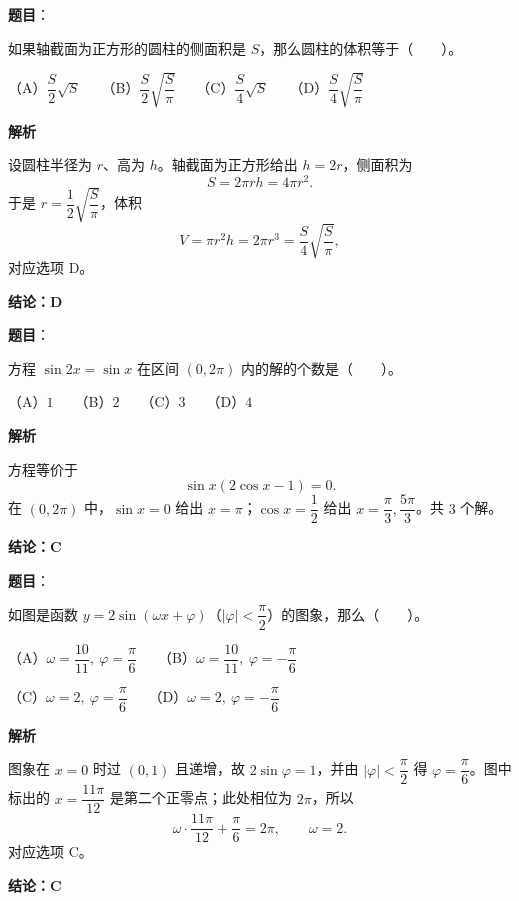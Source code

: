 \begin{answer}

\textbf{题目}：

如果轴截面为正方形的圆柱的侧面积是 $S$，那么圆柱的体积等于\mbox{（　　）}。

（A）$\dfrac S2\sqrt S$　　（B）$\dfrac S2\sqrt{\dfrac S\pi}$　　（C）$\dfrac S4\sqrt S$　　（D）$\dfrac S4\sqrt{\dfrac S\pi}$

\textbf{解析}

设圆柱半径为 $r$、高为 $h$。轴截面为正方形给出 $h=2r$，侧面积为
\nopagebreak[4]
\[
S=2\pi rh=4\pi r^2.
\]
于是 $r=\dfrac12\sqrt{\dfrac S\pi}$，体积
\nopagebreak[4]
\[
V=\pi r^2h=2\pi r^3
=\frac S4\sqrt{\frac S\pi},
\]
对应选项 D。

\textbf{结论：D}


\end{answer}
\begin{answer}

\textbf{题目}：

方程 $\sin 2x=\sin x$ 在区间 $(0,2\pi)$ 内的解的个数是\mbox{（　　）}。

（A）$1$　　（B）$2$　　（C）$3$　　（D）$4$

\textbf{解析}

方程等价于
\nopagebreak[4]
\[
\sin x(2\cos x-1)=0.
\]
在 $(0,2\pi)$ 中，$\sin x=0$ 给出 $x=\pi$；$\cos x=\dfrac12$ 给出 $x=\dfrac\pi3,\dfrac{5\pi}{3}$。共 $3$ 个解。

\textbf{结论：C}


\end{answer}
\begin{answer}

\textbf{题目}：

如图是函数 $y=2\sin(\omega x+\varphi)$（$|\varphi|<\dfrac\pi2$）的图象，那么\mbox{（　　）}。
\nopagebreak[4]
\begin{center}\end{center}
\nopagebreak[4]
（A）$\omega=\dfrac{10}{11},\ \varphi=\dfrac\pi6$　　（B）$\omega=\dfrac{10}{11},\ \varphi=-\dfrac\pi6$

（C）$\omega=2,\ \varphi=\dfrac\pi6$　　（D）$\omega=2,\ \varphi=-\dfrac\pi6$

\textbf{解析}

图象在 $x=0$ 时过 $(0,1)$ 且递增，故 $2\sin\varphi=1$，并由 $|\varphi|<\dfrac\pi2$ 得 $\varphi=\dfrac\pi6$。图中标出的 $x=\dfrac{11\pi}{12}$ 是第二个正零点；此处相位为 $2\pi$，所以
\nopagebreak[4]
\[
\omega\cdot\frac{11\pi}{12}+\frac\pi6=2\pi,
\qquad \omega=2.
\]
对应选项 C。

\textbf{结论：C}


\end{answer}
